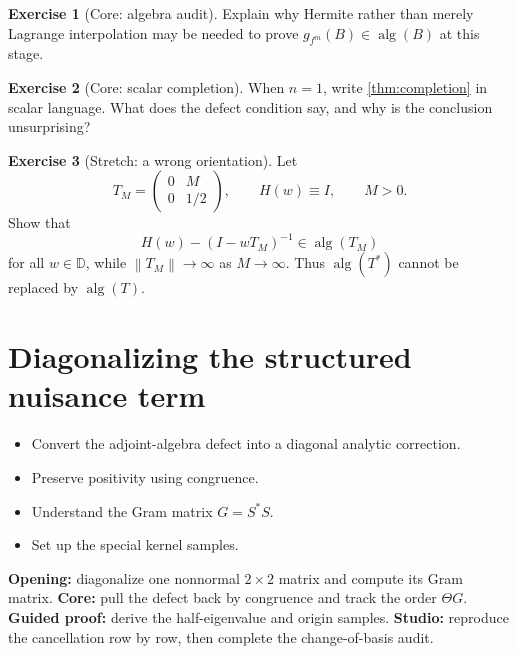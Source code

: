 \documentclass[11pt,oneside,openany]{book}
\theoremstyle{definition}
\newtheorem{exercise}{Exercise}[chapter]
\theoremstyle{remark}
\newcommand{\D}{\mathbb D}
\newcommand{\alg}{\operatorname{alg}}
\newcommand{\norm}[1]{\left\lVert #1\right\rVert}
\begin{document}
\begin{exercise}[Core: algebra audit]
Explain why Hermite rather than merely Lagrange interpolation may be
needed to prove \(g_{f^m}(B)\in\alg(B)\) at this stage.
\end{exercise}

\begin{exercise}[Core: scalar completion]
When \(n=1\), write \cref{thm:completion} in scalar language.  What does
the defect condition say, and why is the conclusion unsurprising?
\end{exercise}

\begin{exercise}[Stretch: a wrong orientation]
\label{ex:wrong-orientation}
Let
\[
  T_M=\begin{pmatrix}0&M\\0&1/2\end{pmatrix},
  \qquad H(w)\equiv I,
  \qquad M>0.
\]
Show that
\[
  H(w)-(I-wT_M)^{-1}\in\alg(T_M)
\]
for all \(w\in\D\), while \(\norm{T_M}\to\infty\) as \(M\to\infty\).
Thus \(\alg(T^*)\) cannot be replaced by \(\alg(T)\).
\end{exercise}

\chapter{Diagonalizing the structured nuisance term}
\label{ch:diagonal-nuisance}

\begin{learninggoals}
\begin{itemize}
  \item Convert the adjoint-algebra defect into a diagonal analytic
  correction.
  \item Preserve positivity using congruence.
  \item Understand the Gram matrix \(G=S^*S\).
  \item Set up the special kernel samples.
\end{itemize}
\end{learninggoals}

\begin{workshopplan}
\textbf{Opening:} diagonalize one nonnormal \(2\times2\) matrix and
compute its Gram matrix. \textbf{Core:} pull the defect back by
congruence and track the order \(\Theta G\).
\textbf{Guided proof:} derive the half-eigenvalue and origin samples.
\textbf{Studio:} reproduce the cancellation row by row, then complete
the change-of-basis audit.
\end{workshopplan}
\end{document}
